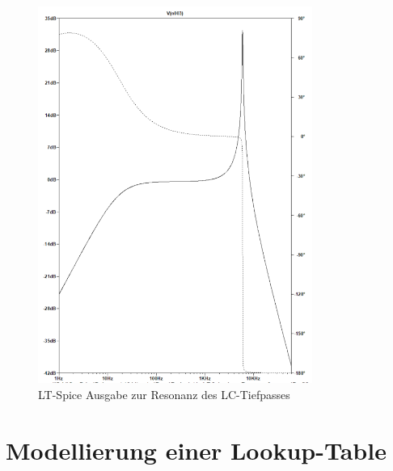 \documentclass[a4paper,11pt,oneside]{article}
\begin{document}
\begin{figure}[H]
	\centering
	\includegraphics[width=0.8\textwidth]{Bodeplot R fullspec.png}
	\caption{LT-Spice Ausgabe zur Resonanz des LC-Tiefpasses}
\end{figure}

\section{Modellierung einer Lookup-Table}
\end{document}
